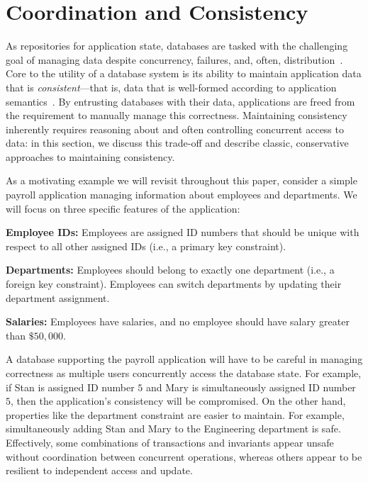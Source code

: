 
\section{Coordination and Consistency}
\label{sec:motivation}


As repositories for application state, databases are tasked with the
challenging goal of managing data despite concurrency, failures, and,
often, distribution~\cite{bernstein-book}. Core to the utility of a
database system is its ability to maintain application data that is
\textit{consistent}---that is, data that is well-formed according to
application semantics~\cite{gray-virtues}. By entrusting databases
with their data, applications are freed from the requirement to
manually manage this correctness. Maintaining consistency inherently
requires reasoning about and often controlling concurrent access to
data: in this section, we discuss this trade-off and describe classic,
conservative approaches to maintaining consistency.

 As a motivating example we will revisit
throughout this paper, consider a simple payroll application managing
information about employees and departments. We will focus on three
specific features of the application:
\begin{myitemize}
\item\textbf{Employee IDs:} Employees are assigned ID numbers that
  should be unique with respect to all other assigned IDs (i.e., a
  primary key constraint).
  \item\textbf{Departments:} Employees should belong to exactly one
  department (i.e., a foreign key constraint). Employees can switch
  departments by updating their department assignment.
\item\textbf{Salaries:} Employees have salaries, and no employee
  should have salary greater than $\$50,000$.
\end{myitemize}
A database supporting the payroll application will have to be careful
in managing correctness as multiple users concurrently access the
database state. For example, if Stan is assigned ID number $5$ and
Mary is simultaneously assigned ID number $5$, then the application's
consistency will be compromised. On the other hand, properties like
the department constraint are easier to maintain. For example,
simultaneously adding Stan and Mary to the Engineering department is
safe. Effectively, some combinations of transactions and invariants
appear unsafe without coordination between concurrent operations,
whereas others appear to be resilient to independent access and
update.


